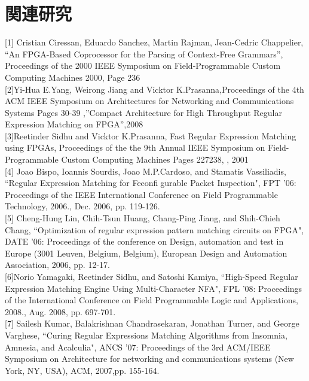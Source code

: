 \documentclass[12pt,oneside]{report}
\begin{document}
\chapter{関連研究}
\label{RelatedWorks}
   [1] Cristian Ciressan, Eduardo Sanchez, Martin Rajman, Jean-Cedric Chappelier, “An FPGA-Based Coprocessor for the Parsing of Context-Free Grammars”, Proceedings of the 2000 IEEE Symposium on Field-Programmable Custom Computing Machines 2000, Page 236\\

[2]Yi-Hua E.Yang, Weirong Jiang and Vicktor K.Prasanna,Proceedings of the 4th ACM IEEE Symposium on Architectures for Networking and Communications Systems Pages 30-39 ,”Compact Architecture for High Throughput Regular Expression Matching on FPGA”,2008\\

[3]Reetinder Sidhu and Vicktor K.Prasanna, Fast Regular Expression Matching using FPGAs, Proceedings of the the 9th Annual IEEE Symposium on Field-Programmable Custom Computing Machines Pages 227238, , 2001\\

[4] Joao Bispo, Ioannis Sourdis, Joao M.P.Cardoso, and Stamatis Vassiliadis, ``Regular Expression Matching for Feconfigurable Packet Inspection", FPT '06: Proceedings of the IEEE International Conference on Field Programmable Technology, 2006., Dec. 2006, pp. 119-126.\\

[5] Cheng-Hung Lin, Chih-Tsun Huang, Chang-Ping Jiang, and Shih-Chieh Chang, ``Optimization of regular expression pattern matching circuits on FPGA", DATE '06: Proceedings of the conference on Design, automation and test in Europe (3001 Leuven, Belgium, Belgium), European Design and Automation Association, 2006, pp. 12-17.\\

[6]Norio Yamagaki, Reetinder Sidhu, and Satoshi Kamiya, ``High-Speed Regular Expression Matching Engine Using Multi-Character NFA", FPL '08: Proceedings of the International Conference on Field Programmable Logic and Applications, 2008., Aug. 2008, pp. 697-701.\\

[7] Sailesh Kumar, Balakrishnan Chandrasekaran, Jonathan Turner, and George Varghese, ``Curing Regular Expressions Matching Algorithms from Insomnia, Amnesia, and Acalculia", ANCS '07: Proceedings of the 3rd ACM/IEEE Symposium on Architecture for networking and communications systems (New York, NY, USA), ACM, 2007,pp. 155-164.\\
\end{document}
